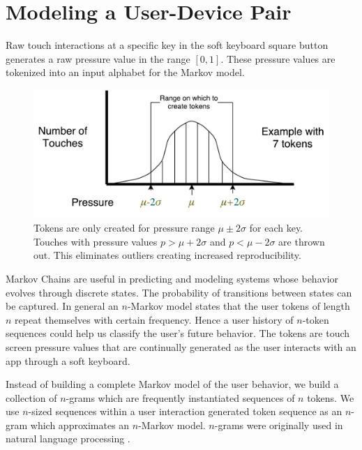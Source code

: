 \documentclass{acm_proc_article-sp}
\begin{document}
\section{Modeling a User-Device Pair}
\label{sec:modeling}
Raw touch interactions at a specific key in the soft keyboard square button
generates a raw pressure value in the range $[0,1]$. These pressure values are tokenized
into an input alphabet for the Markov model.
 
\begin{figure}
\centering
\includegraphics[width=.45\textwidth, keepaspectratio]{token_creation.pdf}
\caption{
Tokens are only created for 
pressure range $\mu \pm 2\sigma$ 
for each key.
Touches with pressure values
$p>\mu + 2\sigma$ and $p<\mu - 2\sigma$
are thrown out.
This eliminates outliers creating
increased reproducibility.
}
\label{fig:token_creation}
\end{figure}

Markov Chains are useful in predicting and modeling systems whose behavior evolves through discrete states. 
The probability of transitions between states can be captured.
In general an $n$-Markov model states that the
user tokens of length $n$ repeat themselves with certain frequency.
Hence a user history of $n$-token sequences could help us classify the user's future behavior. The tokens are
touch screen pressure values that are continually generated as the user interacts with an app
through a soft keyboard.


Instead of building a complete Markov model of the user behavior,
we build a collection of $n$-grams
which are frequently instantiated sequences of $n$ tokens.
We use $n$-sized sequences 
within a user interaction
generated token sequence as an
$n$-gram which approximates an $n$-Markov model.
$n$-grams were originally
used in natural language processing \cite{Brown:ngram}.
\end{document}
